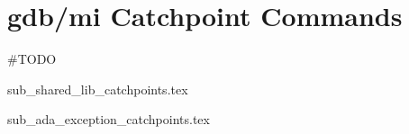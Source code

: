 \section{gdb/mi Catchpoint Commands}

\#TODO

{sub_shared_lib_catchpoints.tex}

{sub_ada_exception_catchpoints.tex}
